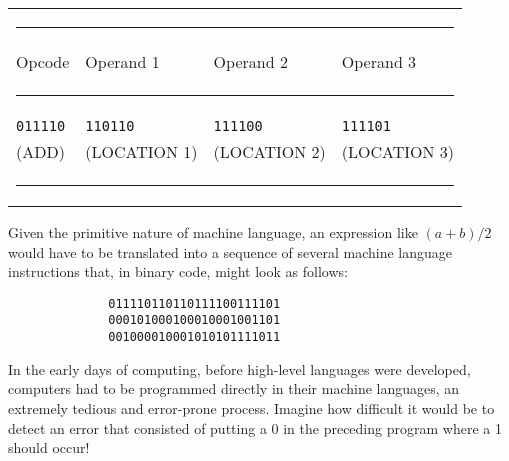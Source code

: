 \begin{center}
\UNTB\begin{tabular}{llll}
\multicolumn{4}{l}{
\color{cyan}
\rule[0pt]{21.1pc}{1pt}}\\[2pt]
{Opcode} &{Operand 1} &{Operand 2} &{Operand 3}
\\[-4pt]\multicolumn{4}{l}{
\color{cyan}
\rule[0pt]{21.1pc}{0.5pt}}\\[2pt]
{\tt 011110} & {\tt 110110}   & {\tt 111100}   & {\tt 111101}\\
(ADD)        & (LOCATION 1)   & (LOCATION 2)   & (LOCATION 3)
\\[-4pt]\multicolumn{4}{l}{
\color{cyan}
\rule[0pt]{21.1pc}{1pt}}\\[-12pt]
\end{tabular}
\end{center}
\endUNTB


\noindent Given the primitive nature of machine language, an
expression like $(a + b)/2$ would have to be translated
into a sequence of several machine language instructions that, in
binary code, might look as follows:

\medskip
\begin{jjjlisting}
\begin{lstlisting}
              011110110110111100111101
              000101000100010001001101
              001000010001010101111011
\end{lstlisting}
\end{jjjlisting}
\medskip

In the early days of computing, before high-level languages were
developed, computers had to be programmed directly in their machine
languages, an extremely tedious and error-prone process.  Imagine how
\mbox{difficult} it would be to detect an error that consisted of putting a 0
in the preceding program where a 1 should occur!

